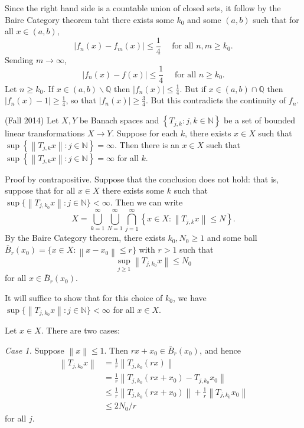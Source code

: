 \documentclass{exam}
\theoremstyle{problemstyle}
\newcommand{\norm}[1]{\left\lVert#1\right\rVert} %
\newcommand{\1}[1]{\textbf{1}_{\left[#1\right]}} %
\def\Q{\mathbb{Q}} %
\begin{document}
\begin{questions}
\begin{solution}
  Since the right hand side is a countable union of closed sets, it follow by the Baire Category theorem taht there exists some $k_{0}$ and some $(a,b)$ such that for all $x\in (a,b)$,
  \begin{equation*}
    |f_{n}(x)-f_{m}(x)| \leq \frac{1}{4}\quad\text{ for all }n,m\geq k_{0}.
  \end{equation*}
  Sending $m\to \infty$,
  \begin{equation*}
    |f_{n}(x)-f(x)| \leq \frac{1}{4}\quad\text{ for all }n\geq k_{0}.
  \end{equation*}
  Let $n\geq k_{0}$. If $x\in (a,b)\backslash \Q$ then $|f_{n}(x)|\leq \frac{1}{4}$. But if $x\in (a,b)\cap \Q$ then $|f_{n}(x)-1|\geq \frac{1}{4}$, so that $|f_{n}(x)|\geq \frac{3}{4}$. But this contradicts the continuity of $f_{n}$.
\end{solution}


\item (Fall 2014)
  Let $X,Y$ be Banach spaces and $\left\{ T_{j,k}: j,k\in \mathbb{N} \right\}$ be a set of bounded linear transformations $X\to Y$. Suppose for each $k$, there exists $x\in X$ such that $\sup \left\{ \norm{T_{j,k}x}:  j\in \mathbb{N} \right\} = \infty.$ Then there is an $x\in X$ such that $\sup \left\{ \norm{T_{j,k} x} : j\in \mathbb{N}\right\} = \infty$ for all $k.$
  \begin{solution}
    Proof by contrapositive. Suppose that the conclusion does not hold: that is, suppose that for all $x\in X$ there exists some $k$ such that $\sup \{\norm{T_{j,k_{0}}x}:j\in\mathbb{N}\}<\infty$. Then we can write
\begin{equation*}
  X=\bigcup_{k= 1}^{\infty} \bigcup_{N= 1}^{\infty} \bigcap_{j= 1}^{\infty} \left\{ x\in X: \norm{T_{j,k}x}\leq N \right\}.
\end{equation*}
By the Baire Category theorem, there exists $k_{0},N_{0}\geq 1$ and some ball $\bar{B}_{r}(x_{0})= \{x\in X : \norm{x-x_0}\leq r\}$ with $r>1$ such that $$\sup_{j\geq 1}\norm{T_{j,k_{0}}x}\leq N_{0}$$ for all $x\in \bar{B}_r(x_0)$.

It will suffice to show that for this choice of $k_{0}$, we have $\sup \{\norm{T_{j,k_{0}}x}: j\in \mathbb{N}\}<\infty$ for all $x\in X$.

Let $x\in X$. There are two cases:

\textit{Case 1.} Suppose $\norm{x}\leq 1$. Then $rx+x_{0}\in \bar{B}_{r}(x_{0})$, and hence
\begin{align*}
  \norm{T_{j,k_{0}}x}
  &= \frac{1}{r}\norm{T_{j,k_{0}}(rx)}\\ 
  &=  \frac{1}{r} \norm{T_{j,k_{0}}(rx + x_{0})-T_{j,k_{0}}x_{0}}\\ 
  &\leq \frac{1}{r}\norm{T_{j,k_{0}}(rx + x_{0})} +\frac{1}{r}\norm{T_{j,k_{0}}x_{0}}\\ 
  &\leq 2N_{0}/r
\end{align*}
for all $j$.


\end{solution}
\end{questions}
\end{document}
